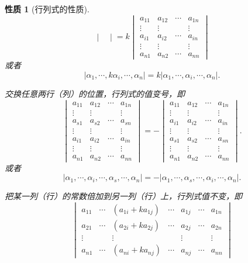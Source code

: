 \documentclass[a4paper]{book}
\newtheorem{prop}{性质}[chapter]
\begin{document}
\begin{prop}[行列式的性质]
$$\begin{vmatrix}
\end{vmatrix} = k\begin{vmatrix}
a_{11} & a_{12} & \cdots & a_{1n} \\ \vdots & \vdots & & \vdots \\ a_{i1} & a_{i2} & \cdots & a_{in} \\ \vdots & \vdots & & \vdots \\ a_{n1} & a_{n2} & \cdots & a_{nn}
\end{vmatrix}$$
或者
$$\left|\alpha_1, \cdots, k\alpha_i, \cdots, \alpha_n \right| = k \left|\alpha_1, \cdots, \alpha_i, \cdots, \alpha_n \right|.$$
\item[性质$4$.] 交换任意两行（列）的位置，行列式的值变号，即
$$\begin{vmatrix}
a_{11} & a_{12} & \cdots & a_{1n} \\ \vdots & \vdots & & \vdots \\ a_{s1} & a_{s2} & \cdots & a_{sn} \\ \vdots & \vdots & & \vdots \\ a_{i1} & a_{i2} & \cdots & a_{in} \\ \vdots & \vdots & & \vdots \\ a_{n1} & a_{n2} & \cdots & a_{nn}
\end{vmatrix} = - \begin{vmatrix}
a_{11} & a_{12} & \cdots & a_{1n} \\ \vdots & \vdots & & \vdots \\ a_{i1} & a_{i2} & \cdots & a_{in} \\ \vdots & \vdots & & \vdots \\ a_{s1} & a_{s2} & \cdots & a_{sn} \\ \vdots & \vdots & & \vdots \\ a_{n1} & a_{n2} & \cdots & a_{nn}
\end{vmatrix}.$$
或者
$$\left|\alpha_1, \cdots, \alpha_i, \cdots, \alpha_s, \cdots, \alpha_n \right| = -\left|\alpha_1, \cdots, \alpha_s, \cdots, \alpha_i, \cdots, \alpha_n \right|.$$
\item[性质$5$.] 把某一列（行）的常数倍加到另一列（行）上，行列式值不变，即
$$\begin{vmatrix}
a_{11} & \cdots & (a_{1i} + ka_{1j}) & \cdots & a_{1j} & \cdots & a_{1n} \\ a_{21} & \cdots & (a_{2i} + ka_{2j}) & \cdots & a_{2j} & \cdots & a_{2n} \\ \vdots & & \vdots & & \vdots & & \vdots \\ a_{n1} & \cdots & (a_{ni} + ka_{nj}) & \cdots & a_{nj} & \cdots & a_{nn}

\end{vmatrix}$$
\end{prop}
\end{document}
